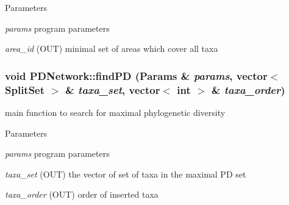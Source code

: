 \begin{DoxyParams}{Parameters}
\item[{\em params}]program parameters \item[{\em area\_\-id}](OUT) minimal set of areas which cover all taxa \end{DoxyParams}
\hypertarget{classPDNetwork_ae481d52c7f411e1fa1f768746329130b}{
\subsubsection[{findPD}]{\setlength{\rightskip}{0pt plus 5cm}void PDNetwork::findPD ({\bf Params} \& {\em params}, \/  vector$<$ {\bf SplitSet} $>$ \& {\em taxa\_\-set}, \/  vector$<$ int $>$ \& {\em taxa\_\-order})}}
\label{classPDNetwork_ae481d52c7f411e1fa1f768746329130b}
main function to search for maximal phylogenetic diversity 
\begin{DoxyParams}{Parameters}
\item[{\em params}]program parameters \item[{\em taxa\_\-set}](OUT) the vector of set of taxa in the maximal PD set \item[{\em taxa\_\-order}](OUT) order of inserted taxa \end{DoxyParams}


